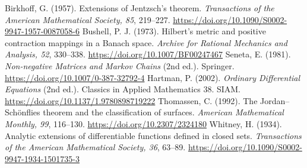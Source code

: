  Birkhoff, G. (1957). Extensions of Jentzsch's theorem. \emph{Transactions of the American Mathematical Society, 85}, 219--227. \url{https://doi.org/10.1090/S0002-9947-1957-0087058-6}
 Bushell, P. J. (1973). Hilbert's metric and positive contraction mappings in a Banach space. \emph{Archive for Rational Mechanics and Analysis, 52}, 330--338. \url{https://doi.org/10.1007/BF00247467}
 Seneta, E. (1981). \emph{Non-negative Matrices and Markov Chains} (2nd ed.). Springer. \url{https://doi.org/10.1007/0-387-32792-4}
 Hartman, P. (2002). \emph{Ordinary Differential Equations} (2nd ed.). Classics in Applied Mathematics 38. SIAM. \url{https://doi.org/10.1137/1.9780898719222}
 Thomassen, C. (1992). The Jordan--Sch\"onflies theorem and the classification of surfaces. \emph{American Mathematical Monthly, 99}, 116--130. \url{https://doi.org/10.2307/2324180}
 Whitney, H. (1934). Analytic extensions of differentiable functions defined in closed sets. \emph{Transactions of the American Mathematical Society, 36}, 63--89. \url{https://doi.org/10.1090/S0002-9947-1934-1501735-3}
